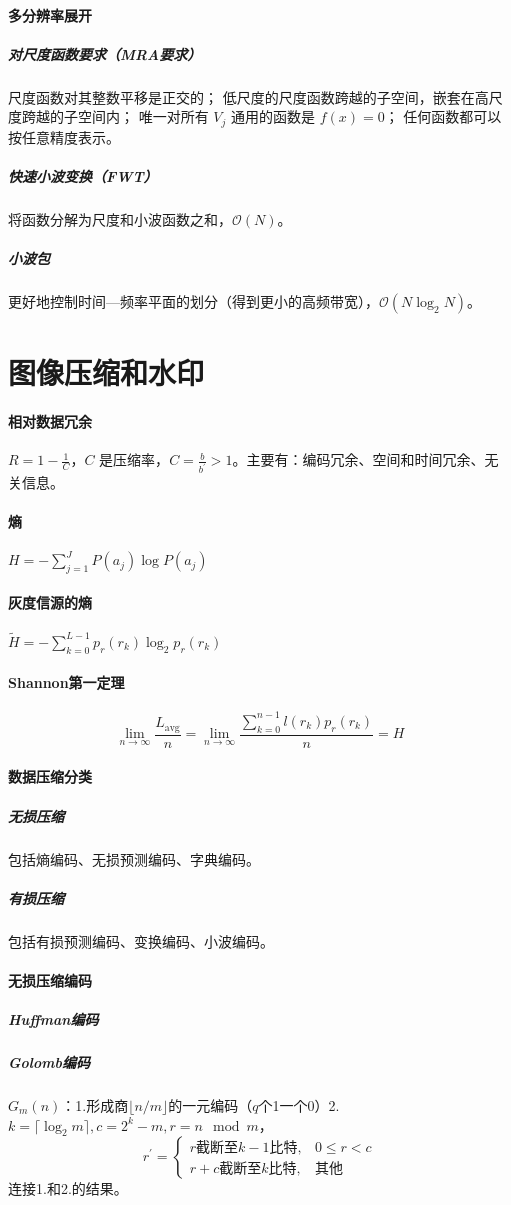 \documentclass[twocolumn]{ctexart}
\begin{document}
\paragraph{多分辨率展开}
\subparagraph{对尺度函数要求（MRA要求）}
尺度函数对其整数平移是正交的；
低尺度的尺度函数跨越的⼦空间，嵌套在⾼尺度跨越的⼦空间内；
唯⼀对所有 $V_j$ 通⽤的函数是 $f(x)=0$；
任何函数都可以按任意精度表示。
\subparagraph{快速小波变换（FWT）} 将函数分解为尺度和小波函数之和，$\mathcal{O}(N)$。
\subparagraph{小波包} 更好地控制时间---频率平面的划分（得到更小的高频带宽），$\mathcal{O}(N\log_2 N)$。
\section{图像压缩和水印}
\paragraph{相对数据冗余} $R=1-\frac{1}{C}$，$C$ 是压缩率，$C=\frac{b}{b^\prime}>1$。主要有：编码冗余、空间和时间冗余、无关信息。
\paragraph{熵} $H=-\sum_{j=1}^J P(a_j)\log P(a_j)$
\paragraph{灰度信源的熵} $\tilde{H}=-\sum_{k=0}^{L-1}p_r(r_k)\log_2p_r(r_k)$
\paragraph{Shannon第一定理}
$$\lim_{n\rightarrow\infty}\frac{L_\text{avg}}{n}=\lim_{n\rightarrow\infty}\frac{\sum_{k=0}^{n-1}l(r_k)p_r(r_k)}{n}=H$$
\paragraph{数据压缩分类}
\subparagraph{⽆损压缩}包括熵编码、⽆损预测编码、字典编码。
\subparagraph{有损压缩}包括有损预测编码、变换编码、⼩波编码。
\paragraph{无损压缩编码}
\subparagraph{Huffman编码}
\subparagraph{Golomb编码} $G_m(n)$：1.形成商$\lfloor n/m\rfloor$的一元编码（$q$个1一个0）2. $k=\lceil\log_2 m\rceil, c=2^k-m, r=n\mod m$，$$r^\prime=\begin{cases}
    r\text{截断至}k-1\text{比特},&0\leq r<c\\
    r+c\text{截断至}k\text{比特},&其他
\end{cases}$$连接1.和2.的结果。
\end{document}
